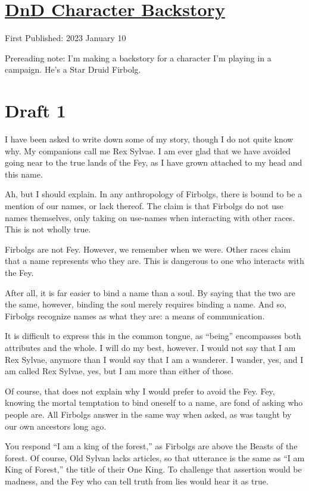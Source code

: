 \documentclass[12pt]{article}[titlepage]
\newcommand{\say}[1]{``#1''}
\renewcommand{\,}{\textsuperscript{,}}
\begin{document}
\doublespacing
\section{\href{dungeons-dragons-rex-0.html}{DnD Character Backstory}}
First Published: 2023 January 10

Prereading note: I'm making a backstory for a character I'm playing in a campaign.
He's a Star Druid Firbolg.
\section{Draft 1}
I have been asked to write down some of my story, though I do not quite know why.
My companions call me Rex Sylvae.
I am ever glad that we have avoided going near to the true lands of the Fey, as I have grown attached to my head and this name.

Ah, but I should explain.
In any anthropology of Firbolgs, there is bound to be a mention of our names, or lack thereof.
The claim is that Firbolgs do not use names themselves, only taking on use-names when interacting with other races.
This is not wholly true.

Firbolgs are not Fey.
However, we remember when we were.
Other races claim that a name represents who they are.
This is dangerous to one who interacts with the Fey.

After all, it is far easier to bind a name than a soul.
By saying that the two are the same, however, binding the soul merely requires binding a name.
And so, Firbolgs recognize names as what they are: a means of communication.

It is difficult to express this in the common tongue, as \say{being} encompasses both attributes and the whole.
I will do my best, however.
I would not say that I am Rex Sylvae, anymore than I would say that I am a wanderer.
I wander, yes, and I am called Rex Sylvae, yes, but I am more than either of those.

Of course, that does not explain why I would prefer to avoid the Fey.
Fey, knowing the mortal temptation to bind oneself to a name, are fond of asking who people are.
All Firbolgs answer in the same way when asked, as was taught by our own ancestors long ago.

You respond \say{I am a king of the forest,} as Firbolgs are above the Beasts of the forest.
Of course, Old Sylvan lacks articles, so that utterance is the same as \say{I am King of Forest,} the title of their One King.
To challenge that assertion would be madness, and the Fey who can tell truth from lies would hear it as true.
\end{document}

